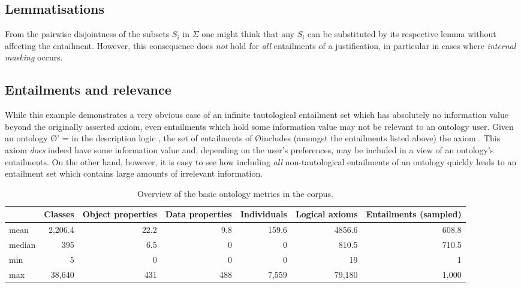 \subsection*{Lemmatisations}
From the pairwise disjointness of the subsets $S_{i}$ in $\Sigma$ one might think that any $S_{i}$ can be substituted by its respective lemma without affecting the entailment. However, this consequence does \emph{not} hold for \emph{all} entailments of a justification, in particular in cases where \emph{internal masking} occurs. 


\subsection*{Entailments and relevance}
While this example demonstrates a very obvious case of an infinite tautological entailment set which has absolutely no information value beyond the originally asserted axiom, even entailments which hold some information value may not be relevant to an ontology user. Given an ontology \O' =  in the description logic , the set of entailments of \O includes (amongst the entailments listed above) the axiom . This axiom \emph{does} indeed have some information value and, depending on the user's preferences, may be included in a view of an ontology's entailments. On the other hand, however, it is easy to see how including \emph{all} non-tautological entailments of an ontology quickly leads to an entailment set which contains large amounts of irrelevant information.


\begin{table}
\caption{Overview of the basic ontology metrics in the corpus.}
\label{tab:ontologies}
\centering
\begin{tabular}{lrrrrrr}
\hline
 & Classes & Object properties & Data properties & Individuals & Logical axioms & Entailments (sampled) \\
\hline
mean		& 	2,206.4 & 22.2		& 9.8		& 159.6 	&  4856.6		&  	608.8 \\
median 	&  395		 & 6.5		&  0			& 0 			& 	810.5		& 710.5 \\
min 			& 	5			& 0			&  0 			&  0 			& 19 		&  	1 		\\
max			& 	38,640	& 431		& 	488		& 7,559 	& 79,180 & 1,000 \\
\hline 
\end{tabular} 
\end{table}

